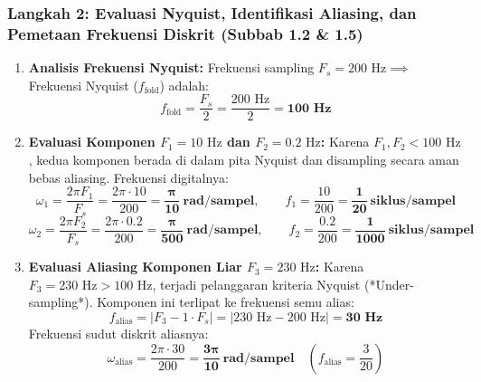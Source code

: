 \documentclass[11pt,a4paper]{article}
\begin{document}
\vspace{0.2cm}
\subsubsection{Langkah 2: Evaluasi Nyquist, Identifikasi Aliasing, dan Pemetaan Frekuensi Diskrit (Subbab 1.2 \& 1.5)}
\begin{enumerate}[leftmargin=*]
  \item \textbf{Analisis Frekuensi Nyquist:}  
  Frekuensi sampling $F_s = 200\text{ Hz} \implies$ Frekuensi Nyquist ($f_{\text{fold}}$) adalah:
  \begin{equation}
  f_{\text{fold}} = \frac{F_s}{2} = \frac{200\text{ Hz}}{2} = \mathbf{100\text{ Hz}}
  \end{equation}
  \item \textbf{Evaluasi Komponen $F_1 = 10\text{ Hz}$ dan $F_2 = 0.2\text{ Hz}$:}  
  Karena $F_1, F_2 < 100\text{ Hz}$, kedua komponen berada di dalam pita Nyquist dan disampling secara aman bebas aliasing. Frekuensi digitalnya:
  \begin{equation}
  \omega_1 = \frac{2\pi F_1}{F_s} = \frac{2\pi \cdot 10}{200} = \mathbf{\frac{\pi}{10}\ \text{rad/sampel}}, \qquad f_1 = \frac{10}{200} = \mathbf{\frac{1}{20}\ \text{siklus/sampel}}
  \end{equation}
  \begin{equation}
  \omega_2 = \frac{2\pi F_2}{F_s} = \frac{2\pi \cdot 0.2}{200} = \mathbf{\frac{\pi}{500}\ \text{rad/sampel}}, \qquad f_2 = \frac{0.2}{200} = \mathbf{\frac{1}{1000}\ \text{siklus/sampel}}
  \end{equation}
  
  \item \textbf{Evaluasi Aliasing Komponen Liar $F_3 = 230\text{ Hz}$:}  
  Karena $F_3 = 230\text{ Hz} > 100\text{ Hz}$, terjadi pelanggaran kriteria Nyquist (*Under-sampling*). Komponen ini terlipat ke frekuensi semu alias:
  \begin{equation}
  f_{\text{alias}} = |F_3 - 1 \cdot F_s| = |230\text{ Hz} - 200\text{ Hz}| = \mathbf{30\text{ Hz}}
  \end{equation}
  Frekuensi sudut diskrit aliasnya:
  \begin{equation}
  \omega_{\text{alias}} = \frac{2\pi \cdot 30}{200} = \mathbf{\frac{3\pi}{10}\ \text{rad/sampel}} \quad \left(f_{\text{alias}} = \frac{3}{20}\right)
  \end{equation}


\end{enumerate}
\end{document}
